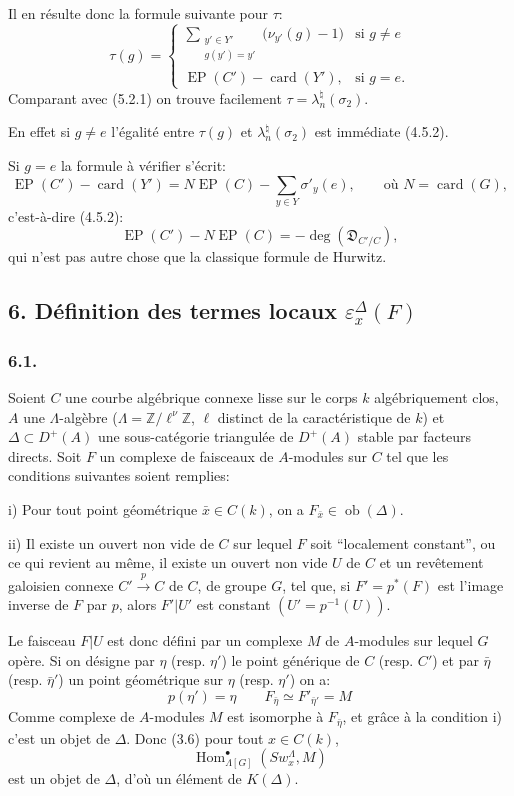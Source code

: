 \documentclass[11pt]{article}
\DeclareMathOperator{\Hom}{Hom}
\providecommand{\EP}{\operatorname{EP}}
\providecommand{\Ob}{\operatorname{ob}}
\providecommand{\Hom}{\operatorname{Hom}}
\providecommand{\Ob}{\operatorname{ob}}
\providecommand{\EP}{\operatorname{EP}}
\providecommand{\Ob}{\operatorname{Ob}}
\providecommand{\Hom}{\operatorname{Hom}}
\providecommand{\Ob}{\operatorname{ob}}
\providecommand{\Ob}{\operatorname{Ob}}
\begin{document}
Il en résulte donc la formule suivante pour $\tau$:
\[
\tau(g)=
\begin{cases}
\displaystyle\sum_{\substack{y'\in Y'\\g(y')=y'}}\bigl(\nu_{y'}(g)-1\bigr)& \text{si } g\ne e\\[0.8em]
\EP(C')-\operatorname{card}(Y'),& \text{si } g=e.
\end{cases}
\tag{5.2.2}
\]
Comparant avec (5.2.1) on trouve facilement $\tau=\lambda_n^\natural(\sigma_2)$.

En effet si $g\ne e$ l'égalité entre $\tau(g)$ et $\lambda_n^\natural(\sigma_2)$ est immédiate (4.5.2).

Si $g=e$ la formule à vérifier s'écrit:
\[
\EP(C')-\operatorname{card}(Y')
=
N\EP(C)-\sum_{y\in Y}\sigma'_y(e),
\qquad\text{où } N=\operatorname{card}(G),
\]
c'est-à-dire (4.5.2):
\[
\EP(C')-N\EP(C)=-\deg(\mathfrak D_{C'/C}),
\]
qui n'est pas autre chose que la classique formule de Hurwitz.

\subsection*{6. Définition des termes locaux $\varepsilon_x^\Delta(F)$}

\subsubsection*{6.1.}

Soient $C$ une courbe algébrique connexe lisse sur le corps $k$ algébriquement clos, $A$ une $\Lambda$-algèbre ($\Lambda=\mathbb Z/\ell^\nu\mathbb Z$, $\ell$ distinct de la caractéristique de $k$) et $\Delta\subset D^+(A)$ une sous-catégorie triangulée de $D^+(A)$ stable par facteurs directs. Soit $F$ un complexe de faisceaux de $A$-modules sur $C$ tel que les conditions suivantes soient remplies:

i) Pour tout point géométrique $\bar x\in C(k)$, on a $F_{\bar x}\in\Ob(\Delta)$.

ii) Il
existe un ouvert non vide de $C$ sur lequel $F$ soit ``localement constant'', ou ce qui revient au même, il existe un ouvert non vide $U$ de $C$ et un revêtement galoisien connexe $C'\xrightarrow{p}C$ de $C$, de groupe $G$, tel que, si $F'=p^*(F)$ est l'image inverse de $F$ par $p$, alors $F'|U'$ est constant $(U'=p^{-1}(U))$.

Le faisceau $F|U$ est donc défini par un complexe $M$ de $A$-modules sur lequel $G$ opère. Si on désigne par $\eta$ (resp. $\eta'$) le point générique de $C$ (resp. $C'$) et par $\bar\eta$ (resp. $\bar\eta'$) un point géométrique sur $\eta$ (resp. $\eta'$) on a:
\[
p(\eta')=\eta\qquad
F_{\bar\eta}\simeq F'_{\bar\eta'}=M
\tag{6.1.1}
\]
Comme complexe de $A$-modules $M$ est isomorphe à $F_{\bar\eta}$, et grâce à la condition i) c'est un objet de $\Delta$. Donc (3.6) pour tout $x\in C(k)$,
\[
\Hom^\bullet_{\Lambda[G]}(Sw_x^\Lambda,M)
\]
est un objet de $\Delta$, d'où un élément de $K(\Delta)$.
\end{document}
